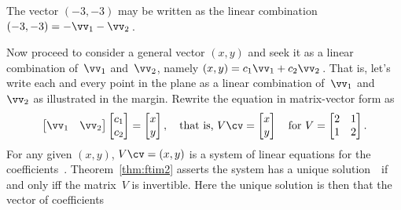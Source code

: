 \begin{example}
\begin{solution}
\begin{parts}
\item The vector \((-3,-3)\) may be written as the linear combination
\((-3,-3)=-\vv_1-\vv_2\)\,. 

\end{parts}

Now proceed to consider a general vector \((x,y)\) and seek it as a linear combination of~\(\vv_1\) and~\(\vv_2\), namely \((x,y)=c_1\vv_1+c_2\vv_2\)\,.
That is, let's write each and every point in the plane as a linear combination of~\(\vv_1\) and~\(\vv_2\) as illustrated in the margin.
%
Rewrite the equation in matrix-vector form as
\begin{equation*}
\begin{bmatrix} \vv_1&\vv_2 \end{bmatrix}
\begin{bmatrix} c_1\\c_2 \end{bmatrix}
=\begin{bmatrix} x\\y \end{bmatrix}
,\quad\text{that is, }
V\cv=\begin{bmatrix} x\\y \end{bmatrix}
\quad\text{for }V=\begin{bmatrix} 2&1\\1&2 \end{bmatrix}.
\end{equation*}
For any given \((x,y)\), \(V\cv=(x,y)\) is a system of linear equations for the coefficients~\cv.
Theorem~\ref{thm:ftim2} asserts the system has a unique solution~\cv\ if and only iff the matrix~\(V\) is invertible.
Here the unique solution is then that the vector of coefficients
\begin{equation*}

\end{equation*}
\end{solution}
\end{example}
